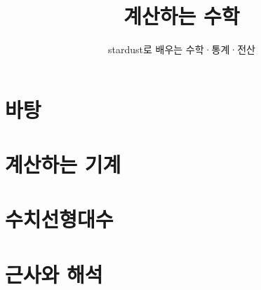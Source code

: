 \documentclass{sdbook}
\begin{document}
\author{}
\title{계산하는 수학}
\subtitle{stardust로 배우는 수학·통계·전산}
\maketitle

\frontmatter
\tableofcontents

\mainmatter
\part{바탕}








\part{계산하는 기계}












\part{수치선형대수}











\part{근사와 해석}













\end{document}
